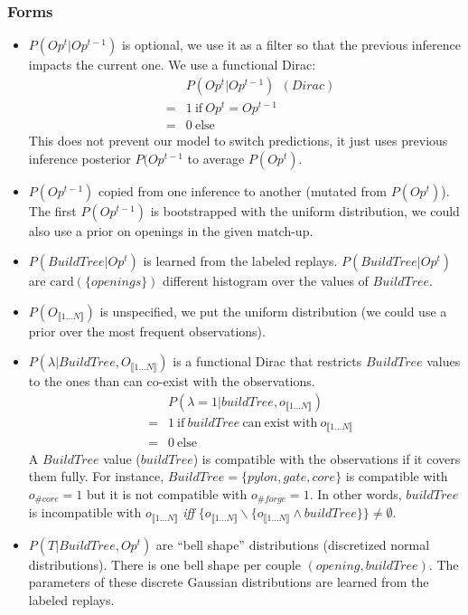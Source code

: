 \subsubsection{Forms}
\begin{itemize}
\item $P(Op^t | Op^{t-1})$ is optional, we use it as a filter so that the previous inference impacts the current one. We use a functional Dirac:
\begin{eqnarray*}
& & P(Op^t|Op^{t-1})\ \  (Dirac)\\
& = & 1\ \mathrm{if}\ Op^t = Op^{t-1}\\
& = & 0\ \mathrm{else}
\end{eqnarray*}
This does not prevent our model to switch predictions, it just uses previous inference posterior $P(Op^{t-1}$ to average $P(Op^t)$.

\item $P(Op^{t-1})$ copied from one inference to another (mutated from $P(Op^t)$). The first $P(Op^{t-1})$ is bootstrapped with the uniform distribution, we could also use a prior on openings in the given match-up.
\item $P(BuildTree | Op^t)$ is learned from the labeled replays. $P(BuildTree|Op^t)$ are $\mathrm{card}(\{openings\})$ different histogram over the values of $BuildTree$.
\item $P(O_{\llbracket 1 \dots N\rrbracket})$ is unspecified, we put the uniform distribution (we could use a prior over the most frequent observations).
\item $P(\lambda | BuildTree, O_{\llbracket 1 \dots N\rrbracket})$ is a functional Dirac that restricts $BuildTree$ values to the ones than can co-exist with the observations.
\begin{eqnarray*}
& & P(\lambda = 1 | buildTree, o_{\llbracket 1 \dots N\rrbracket}) \\
& = & 1\ \mathrm{if\ } buildTree \ \mathrm{can\ exist\ with\ } o_{\llbracket 1\dots N\rrbracket} \\
& = & 0\ \mathrm{else}
\end{eqnarray*}
A $BuildTree$ value ($buildTree$) is compatible with the observations if it covers them fully. For instance, $BuildTree=\{pylon, gate, core\}$ is compatible with $o_{\#core} = 1$ but it is not compatible with $o_{\#forge} = 1$. In other words, $buildTree$ is incompatible with $o_{\llbracket 1\dots N\rrbracket}$ \textit{iff} $\{o_{\llbracket 1\dots N\rrbracket} \backslash \{o_{\llbracket 1\dots N\rrbracket} \wedge buildTree\}\} \neq \emptyset$.
\item $P(T | BuildTree, Op^t)$ are ``bell shape'' distributions (discretized normal distributions). There is one bell shape per couple $(opening, buildTree)$. The parameters of these discrete Gaussian distributions are learned from the labeled replays.
\end{itemize}

